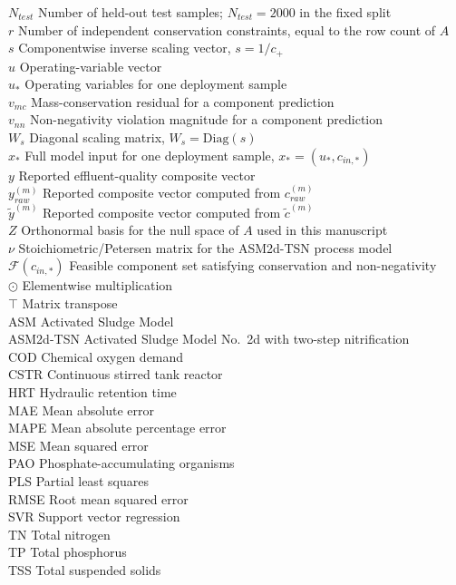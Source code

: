 \documentclass[a4paper,fleqn]{cas-sc}
\begin{document}
\begin{tabbing}
$N_{test}$ \> Number of held-out test samples; $N_{test}=2000$ in the fixed split \\
$r$ \> Number of independent conservation constraints, equal to the row count of $A$ \\
$s$ \> Componentwise inverse scaling vector, $s=1/c_+$ \\
$u$ \> Operating-variable vector \\
$u_*$ \> Operating variables for one deployment sample \\
$v_{mc}$ \> Mass-conservation residual for a component prediction \\
$v_{nn}$ \> Non-negativity violation magnitude for a component prediction \\
$W_s$ \> Diagonal scaling matrix, $W_s=\mathrm{Diag}(s)$ \\
$x_*$ \> Full model input for one deployment sample, $x_*=(u_*,c_{in,*})$ \\
$y$ \> Reported effluent-quality composite vector \\
$y_{raw}^{(m)}$ \> Reported composite vector computed from $c_{raw}^{(m)}$ \\
$\tilde{y}^{(m)}$ \> Reported composite vector computed from $\tilde{c}^{(m)}$ \\
$Z$ \> Orthonormal basis for the null space of $A$ used in this manuscript \\
$\nu$ \> Stoichiometric/Petersen matrix for the ASM2d-TSN process model \\
$\mathcal{F}(c_{in,*})$ \> Feasible component set satisfying conservation and non-negativity \\
$\odot$ \> Elementwise multiplication \\
$\top$ \> Matrix transpose \\
ASM \> Activated Sludge Model \\
ASM2d-TSN \> Activated Sludge Model No.\ 2d with two-step nitrification \\
COD \> Chemical oxygen demand \\
CSTR \> Continuous stirred tank reactor \\
HRT \> Hydraulic retention time \\
MAE \> Mean absolute error \\
MAPE \> Mean absolute percentage error \\
MSE \> Mean squared error \\
PAO \> Phosphate-accumulating organisms \\
PLS \> Partial least squares \\
RMSE \> Root mean squared error \\
SVR \> Support vector regression \\
TN \> Total nitrogen \\
TP \> Total phosphorus \\
TSS \> Total suspended solids \\
\end{tabbing}
\end{document}
